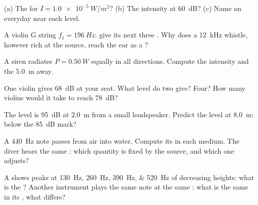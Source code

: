 \begin{exercise}[$\star$]\label{exo:g12:sound-acoustics:4}
(a) The  for $I = \qty{1.0e-5}{W/m^2}$? (b) The
intensity at \qty{60}{dB}? (c) Name an everyday  near each level.
\end{exercise}

\begin{exercise}[$\star$]\label{exo:g12:sound-acoustics:5}
A violin G string  $f_1 = \qty{196}{Hz}$: give its next three
. Why does a \qty{12}{kHz} whistle, however rich at the
source, reach the ear as a ?
\end{exercise}

\begin{exercise}[$\star\star$]\label{exo:g12:sound-acoustics:6}
A siren radiates $P = \qty{0.50}{W}$ equally in all directions.
Compute the intensity and the  \qty{5.0}{m} away.
\end{exercise}

\begin{exercise}[$\star\star$]\label{exo:g12:sound-acoustics:7}
One violin gives \qty{68}{dB} at your seat. What level do two give?
Four? How many violins would it take to reach \qty{78}{dB}?
\end{exercise}

\begin{exercise}[$\star\star$]\label{exo:g12:sound-acoustics:8}
The level is \qty{95}{dB} at \qty{2.0}{m} from a small loudspeaker.
Predict the level at \qty{8.0}{m}: below the \qty{85}{dB} mark?
\end{exercise}

\begin{exercise}[$\star\star$]\label{exo:g12:sound-acoustics:9}
A \qty{440}{Hz} note passes from air into water. Compute its
 in each medium. The diver hears the same : which
quantity is fixed by the source, and which one adjusts?
\end{exercise}

\begin{exercise}[$\star\star$]\label{exo:g12:sound-acoustics:10}
A  shows peaks at \qtylist{130;260;390;520}{Hz} of
decreasing heights: what is the ? Another instrument
plays the same note at the same : what is the same in its
, what differs?
\end{exercise}

